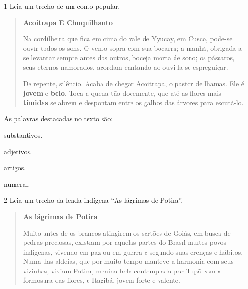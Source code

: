 
\num{1} Leia um trecho de um conto popular.

\begin{quote}
\textbf{Acoitrapa E Chuquilhanto}

Na cordilheira que fica em cima do vale de Yyucay, em Cusco,
pode-se ouvir todos os sons. O vento sopra com sua bocarra;
a manhã, obrigada a se levantar sempre antes dos outros,
boceja morta de sono; os pássaros, seus eternos namorados,
acordam cantando ao ouvi-la se espreguiçar.

De repente, silêncio. Acaba de chegar Acoitrapa, o
pastor de lhamas. Ele é \textbf{jovem} e \textbf{belo}. Toca a quena tão
docemente, que até as flores mais \textbf{tímidas} se abrem e
despontam entre os galhos das árvores para escutá-lo. 
\end{quote}


As palavras destacadas no texto são:

\begin{escolha}
\item substantivos.

\item adjetivos.

\item artigos.

\item numeral.
\end{escolha}

\num{2} Leia um trecho da lenda indígena ``As lágrimas de Potira''.

\begin{quote}
\textbf{As lágrimas de Potira}

Muito antes de os brancos atingirem os sertões de Goiás, em busca de
pedras preciosas, existiam por aquelas partes do Brasil muitos povos
indígenas, vivendo em paz ou em guerra e segundo suas crenças e hábitos.
Numa das aldeias, que por muito tempo manteve a harmonia com seus
vizinhos, viviam Potira, menina bela contemplada por Tupã com a formosura das
flores, e Itagibá, jovem forte e valente. 
\end{quote}


